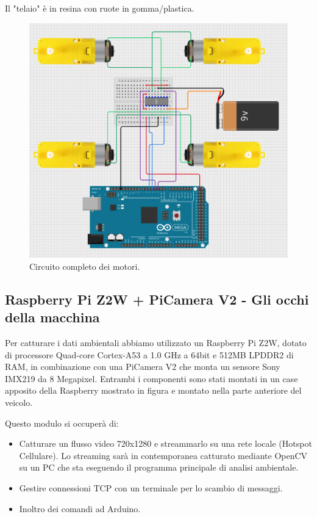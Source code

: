 \documentclass{article}
\begin{document}
Il "telaio" è in resina con ruote in gomma/plastica.



\begin{figure}[h!]
\centering
\includegraphics[width=0.65\linewidth]{img/Schema_Motori_Arduino.png}
\caption{Circuito completo dei motori.}
\end{figure}


\subsection{Raspberry Pi Z2W + PiCamera V2 - Gli occhi della macchina}

 Per catturare i dati ambientali abbiamo utilizzato un Raspberry Pi Z2W, dotato di processore Quad-core Cortex-A53 a 1.0 GHz a 64bit e 512MB LPDDR2 di RAM, in combinazione con una \cite{picamera} PiCamera V2 che monta un sensore Sony IMX219 da 8 Megapixel. Entrambi i componenti sono stati montati in un case apposito della Raspberry mostrato in figura e montato nella parte anteriore del veicolo.

Questo modulo si occuperà di:
\begin{itemize}
\item Catturare un flusso video 720x1280 e streammarlo su una rete locale (Hotspot Cellulare). Lo streaming sarà in contemporanea catturato mediante OpenCV su un PC che sta eseguendo il programma principale di analisi ambientale.
\item Gestire connessioni TCP con un terminale per lo scambio di messaggi.
\item Inoltro dei comandi ad Arduino.
\end{itemize}
\end{document}
